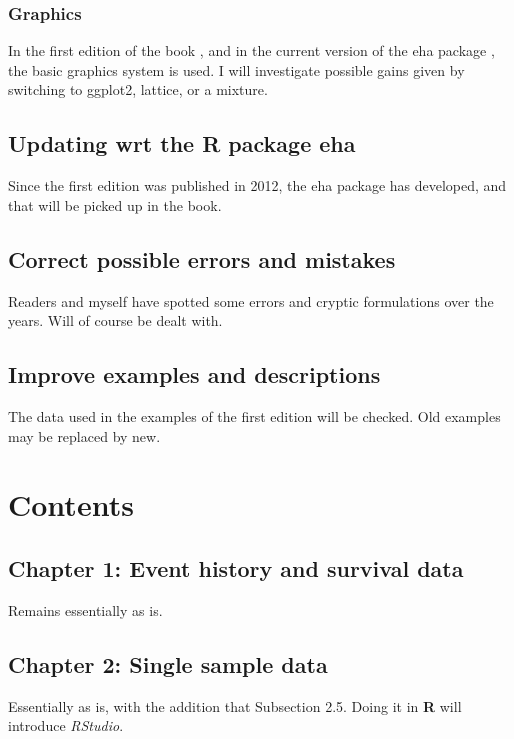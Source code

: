 \documentclass[a4paper,11pt]{article}
\begin{document}
\subsubsection{Graphics}

In the first edition of the book \citep{ehar12}, and in the current version
of the eha package \citep{eha}, the basic graphics system is used. I will 
investigate possible gains given by switching to ggplot2, lattice, or a
mixture.


\subsection{Updating wrt the R package eha}

Since the first edition was published in 2012, the eha package has
developed, and that will be picked up in the book.

\subsection{Correct possible errors and mistakes}

Readers and myself have spotted some errors and cryptic formulations over
the years. Will of course be dealt with.

\subsection{Improve examples and descriptions}

The data used in the examples of the first edition will be checked. Old
examples may be replaced by new.  

\section{Contents} \label{sec:contents}

\subsection*{Chapter 1: Event history and survival data}

Remains essentially as is.

\subsection*{Chapter 2: Single sample data}

Essentially as is, with the addition that Subsection 2.5. Doing it in {\bf
  R} will introduce \emph{RStudio}.
\end{document}
